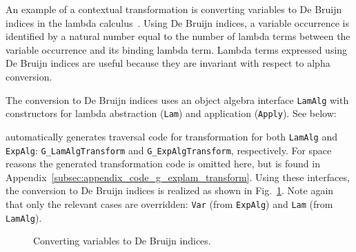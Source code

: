 An example of a contextual transformation is converting variables to De Bruijn indices in the lambda calculus~\cite{deBruijn1972381}.
Using De Bruijn indices, a variable occurrence is identified by a natural number equal to the number of lambda terms between the variable occurrence and its binding lambda term.
Lambda terms expressed using De Bruijn indices are useful because they are invariant with respect to alpha conversion.

The conversion to De Bruijn indices uses an object algebra interface
\lstinline{LamAlg} with constructors for lambda abstraction
(\lstinline{Lam}) and application (\lstinline{Apply}). See below:


\name automatically generates traversal code for transformation for both
\lstinline{LamAlg} and \lstinline{ExpAlg}:
\lstinline{G_LamAlgTransform} and \lstinline{G_ExpAlgTransform},
respectively. For space reasons
the generated transformation code is omitted here, but is found
in Appendix~\ref{subsec:appendix_code_g_explam_transform}. Using these
interfaces, the conversion to De Bruijn indices is
  realized as shown in Fig.~\ref{DeBruijn}. Note again that only the
  relevant cases are overridden: \lstinline{Var} (from
  \lstinline{ExpAlg}) and \lstinline{Lam} (from \lstinline{LamAlg}).


\begin{figure}[t]
\nocaptionrule
\caption{Converting variables to De Bruijn indices.}
\label{DeBruijn}
\end{figure}




